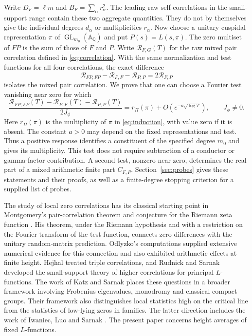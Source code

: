 \documentclass[11pt]{article}
\numberwithin{equation}{section}
\theoremstyle{remark}
\newcommand{\Q}{\mathbb Q}
\newcommand{\GL}{\operatorname{GL}}
\begin{document}
Write $D_F=\ell m$ and $B_F=\sum_\alpha r_\alpha^2$.
The leading raw self-correlations in the small-support range contain
these two aggregate quantities. They do not by themselves give the
individual degrees $d_\alpha$ or multiplicities $r_\alpha$.
Now choose a unitary cuspidal representation $\pi$ of
$\GL_{m_0}(\mathbb A_\Q)$ and put $P(s)=L(s,\pi)$.
The zero multiset of $FP$ is the sum of those of $F$ and $P$.
Write $\mathcal R_{F,G}(T)$ for the raw mixed pair correlation defined
in \eqref{eq:correlation}. With the same normalization and test functions
for all four correlations, the exact difference
\[
 \mathcal R_{FP,FP}-\mathcal R_{F,F}-\mathcal R_{P,P}
       =2\mathcal R_{F,P}
\]
isolates the mixed pair correlation. We prove that one can choose a
Fourier test vanishing near zero for which
\begin{equation}\label{eq:introprobe}
 \frac{\mathcal R_{FP,FP}(T)-\mathcal R_{F,F}(T)
                   -\mathcal R_{P,P}(T)}{2J_\phi}
 =r_\Pi(\pi)+O\!\left(e^{-a\sqrt{\log T}}\right),
 \qquad J_\phi\ne0.
\end{equation}
Here $r_\Pi(\pi)$ is the multiplicity of $\pi$ in
\eqref{eq:induction}, with value zero if it is absent. The constant
$a>0$ may depend on the fixed representations and test. Thus a
positive response identifies a constituent of the specified degree
$m_0$ and gives its multiplicity. This test does not require subtraction
of a conductor or gamma-factor contribution. A second test, nonzero
near zero, determines the real part of a mixed arithmetic finite part
$C_{F,P}$. Section~\ref{sec:probes} gives these statements and their
proofs, as well as a finite-degree stopping criterion for a supplied
list of probes.

The study of local zero correlations has its classical starting point in
Montgomery's pair-correlation theorem and conjecture for the Riemann zeta
function \cite{Montgomery}.  His theorem, under the Riemann hypothesis and
with a restriction on the Fourier transform of the test function, connects
zero differences with the unitary random-matrix prediction.  Odlyzko's
computations \cite{Odlyzko} supplied extensive numerical evidence for this
connection and also exhibited arithmetic effects at finite height.
Hejhal \cite{Hejhal} treated triple correlations, and Rudnick and
Sarnak \cite{RS} developed the small-support theory of higher correlations
for principal $L$-functions.  The work of Katz and Sarnak
\cite{KSbook,KSsurvey} places these questions in a broader framework involving
Frobenius eigenvalues, monodromy and classical compact groups.  Their
framework also distinguishes local statistics high on the critical line
from the statistics of low-lying zeros in families.  The latter direction
includes the work of Iwaniec, Luo and Sarnak \cite{ILS}.  The present paper
concerns height averages of fixed $L$-functions.
\end{document}
